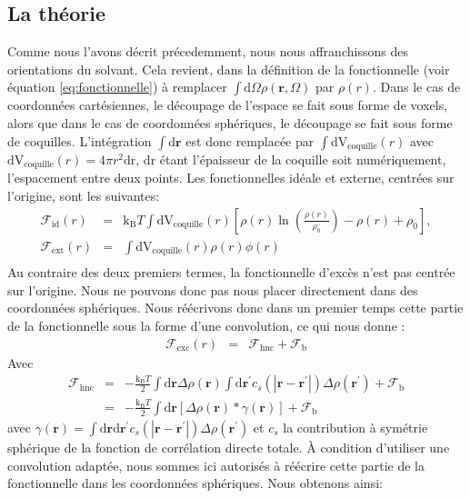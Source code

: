 \subsection{La théorie}
Comme nous l'avons décrit précedemment, nous nous affranchissons des orientations du solvant. Cela revient, dans la définition de la fonctionnelle (voir équation \ref{eq:fonctionnelle}) à remplacer $\int\mathrm{d}\Omega\rho(\boldsymbol{r}, \Omega)$ par $\rho(r)$. Dans le cas de coordonnées cartésiennes, le découpage de l'espace se fait sous forme de voxels, alors que dans le cas de coordonnées sphériques, le découpage se fait sous forme de coquilles. L'intégration $\int\mathrm{d}\boldsymbol{r}$ est donc remplacée par $\int\mathrm{dV}_{\mathrm{coquille}}(r)$ avec $\mathrm{dV}_{\mathrm{coquille}}(r)=4 \pi r^2 \mathrm{dr}$, $\mathrm{dr}$ étant l'épaisseur de la coquille soit numériquement, l'espacement entre deux points. Les fonctionnelles idéale et externe, centrées sur l'origine, sont les suivantes:
\begin{eqnarray}
\mathcal{F}_\mathrm{id}(r)&=&\mathrm{k_B}T\int\mathrm{dV}_{\mathrm{coquille}}(r) [ \rho\left(r \right)\ln\left(\frac{\rho\left(r \right)}{\rho_0}\right)-\rho\left(r \right)+\rho_0 ],\\
\mathcal{F}_\mathrm{ext}(r)&=&\int\mathrm{ dV}_{\mathrm{coquille}}(r)\rho\left(r \right)\phi\left(r \right)\\
\end{eqnarray}
Au contraire des deux premiers termes, la fonctionnelle d'excès n'est pas centrée sur l'origine. Nous ne pouvons donc pas nous placer directement dans des coordonnées sphériques. Nous réécrivons donc dans un premier temps cette partie de la fonctionnelle sous la forme d'une convolution, ce qui nous donne :
\begin{eqnarray}
\mathcal{F}_\mathrm{exc}(r) &=& \mathcal{F}_\mathrm{hnc} + \mathcal{F}_\mathrm{b}
\end{eqnarray}
Avec
\begin{eqnarray}
\mathcal{F}_\mathrm{hnc}&=& -\frac{\mathrm{k_B}T}{2}\int\mathrm{d}\boldsymbol{r} \Delta\rho\left(\boldsymbol{r} \right)  \int\mathrm{d}\boldsymbol{r}^\prime c_s\left(\left|\boldsymbol{r}-\boldsymbol{r}^\prime\right| \right) \Delta\rho\left(\boldsymbol{r}^\prime \right) + \mathcal{F}_\mathrm{b}\\
						 &=& -\frac{\mathrm{k_B}T}{2}\int\mathrm{d}\boldsymbol{r} [ \Delta\rho\left(\boldsymbol{r} \right)  *\gamma(\boldsymbol{r}) ] + \mathcal{F}_\mathrm{b}
\end{eqnarray}
 avec $\gamma(\boldsymbol{r}) = \int\mathrm{d}\boldsymbol{r}\mathrm{d}\boldsymbol{r}^\prime c_s\left(\left|\boldsymbol{r}-\boldsymbol{r}^\prime\right| \right) \Delta\rho\left(\boldsymbol{r}^\prime  \right)$ et $c_s$ la contribution à symétrie sphérique de la fonction de corrélation directe totale. À condition d'utiliser une convolution adaptée, nous sommes ici autorisés à réécrire cette partie de la fonctionnelle dans les coordonnées sphériques. Nous obtenons ainsi:
